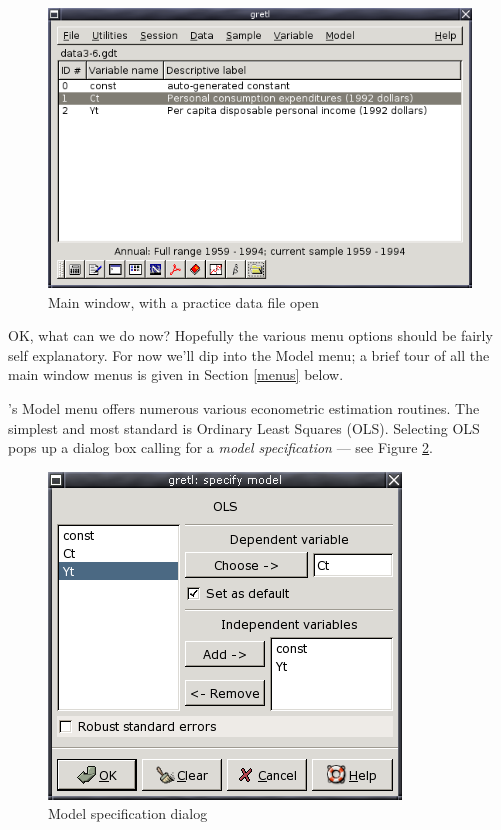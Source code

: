 \begin{figure}[htbp]
  \caption{Main window, with a practice data file open}
  \label{fig-mainwin}
  \begin{center}
    \includegraphics[scale=0.5]{figures/mainwin}
  \end{center}
\end{figure}

OK, what can we do now?  Hopefully the various menu options should be
fairly self explanatory.  For now we'll dip into the Model menu; a
brief tour of all the main window menus is given in Section
\ref{menus} below.
    
's Model menu offers numerous various econometric
estimation routines.  The simplest and most standard is Ordinary Least
Squares (OLS). Selecting OLS pops up a dialog box calling for a
\emph{model specification} --- see Figure \ref{fig-selector}.
    
\begin{figure}[htbp]
  \caption{Model specification dialog}
  \label{fig-selector}
  \begin{center}
    \includegraphics[scale=0.5]{figures/selector}
  \end{center}
\end{figure}

